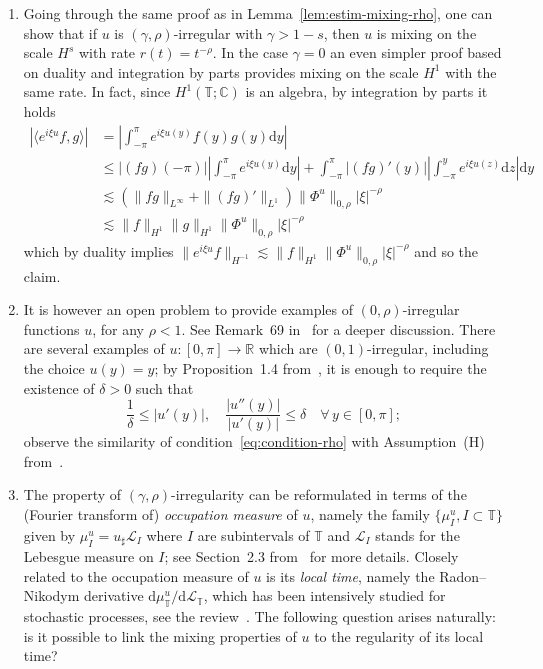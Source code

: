 \documentclass[11pt,oneside,reqno]{amsart}
\newcommand{\mathd}{\mathrm{d}}
\newcommand{\tmtextit}[1]{{{\itshape{#1}}}}
\newenvironment{enumeratenumeric}{\begin{enumerate}[1.] }{\end{enumerate}}
\numberwithin{equation}{section}
\begin{document}
\begin{enumeratenumeric}
  \item Going through the same proof as in Lemma~\ref{lem:estim-mixing-rho},
  one can show that if $u$ is $(\gamma, \rho)$-irregular with $\gamma > 1 -
  s$, then $u$ is mixing on the scale $H^s$ with rate $r (t) = t^{- \rho}$. In
  the case $\gamma = 0$ an even simpler proof based on duality and integration
  by parts provides mixing on the scale $H^1$ with the same rate. In fact,
  since $H^1 (\mathbb{T}; \mathbb{C})$ is an algebra, by integration by parts
  it holds
  \begin{align*}
  | \langle e^{i \xi u} f, g \rangle | & = \left| \int_{- \pi}^{\pi} e^{i
       \xi u (y)} f (y) g (y) \mathd y \right|\\
       & \leqslant | (f g) (- \pi) | \left| \int_{- \pi}^{\pi} e^{i \xi u
       (y)} \mathd y \right|
 + \int_{- \pi}^{\pi} | (f g)' (y) | \left| \int_{- \pi}^y
       e^{i \xi u (z)} \mathd z \right| \mathd y\\
       & \lesssim (\| f g \|_{L^{\infty}} + \| (f g)' \|_{L^1})  \| \Phi^u
       \|_{0, \rho}  | \xi |^{- \rho}\\
       & \lesssim \| f \|_{H^1} \| g \|_{H^1} \| \Phi^u \|_{0, \rho}  | \xi
       |^{- \rho}
  \end{align*}
%
  which by duality implies $\| e^{i \xi u} f \|_{H^{- 1}} \lesssim \| f
  \|_{H^1} \| \Phi^u \|_{0, \rho}  | \xi |^{- \rho}$ and so the claim.
  
  \item It is however an open problem to provide examples of $(0,
  \rho)$-irregular functions $u$, for any $\rho < 1$. See Remark~69
  in~{\cite{galeati2020prevalence}} for a deeper discussion. There are several
  examples of $u : [0, \pi] \rightarrow \mathbb{R}$ which are $(0,
  1)$-irregular, including the choice $u (y) = y$; by Proposition~1.4
  from~{\cite{choukgubinelli1}}, it is enough to require the existence of
  $\delta > 0$ such that
  \begin{equation}
    \frac{1}{\delta} \leqslant | u' (y) |, \quad \frac{| u'' (y) |}{| u' (y)
    |} \leqslant \delta \quad \forall \, y \in [0, \pi] ;
    \label{eq:condition-rho}
  \end{equation}
  observe the similarity of condition~\eqref{eq:condition-rho} with
  Assumption~(H) from~{\cite{zelati2020stable}}.
  
  \item The property of $(\gamma, \rho)$-irregularity can be reformulated in
  terms of the (Fourier transform of) \tmtextit{occupation measure} of $u$,
  namely the family $\{ \mu^u_I, I \subset \mathbb{T} \}$ given by $\mu^u_I =
  u_{\sharp} \mathcal{L}_I$ where $I$ are subintervals of $\mathbb{T}$ and
  $\mathcal{L}_I$ stands for the Lebesgue measure on $I$; see Section~2.3
  from~{\cite{galeati2020prevalence}} for more details. Closely related to the
  occupation measure of $u$ is its \tmtextit{local time}, namely the
  Radon--Nikodym derivative $\mathd \mu^u_{\mathbb{T}} / \mathd
  \mathcal{L}_{\mathbb{T}}$, which has been intensively studied for stochastic
  processes, see the review~{\cite{geman}}. The following question arises
  naturally: is it possible to link the mixing properties of $u$ to the
  regularity of its local time?
  

\end{enumeratenumeric}
\end{document}
